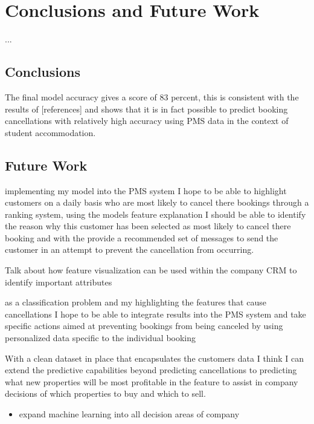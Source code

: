 \chapter{Conclusions and Future Work}
\label{ch:con}
...

\section{Conclusions}
The final model accuracy gives a score  of 83 percent, this is consistent with the results of [references] and shows that it is in fact possible to predict booking cancellations with relatively high accuracy using PMS data in the context of student accommodation. 

\section{Future Work}
implementing my model into the PMS system I hope to be able to highlight customers on a daily basis who are most likely to cancel there bookings through a ranking system, using the models feature explanation I should be able to identify the reason why this customer has been selected as most likely to cancel there booking and with the provide a recommended set of messages to send the customer in an attempt to prevent the cancellation from occurring. 

Talk about how feature visualization can be used within the company CRM to identify important attributes 

as a classification problem and my highlighting the features that cause cancellations I hope to be able to integrate results into the PMS system and take specific actions aimed at preventing bookings from being canceled by using personalized data specific to the individual booking

\vspace{5mm}

With a clean dataset in place that encapsulates the customers data I think I can extend the predictive capabilities beyond predicting cancellations to predicting what new properties will be most profitable in the feature to assist in company decisions of which properties to buy and which to sell.

\begin{itemize}
\item expand machine learning into all decision areas of company
\end{itemize}
